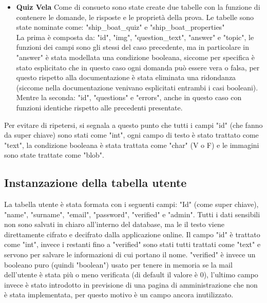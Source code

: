 \begin{itemize}
	\item \textbf{Quiz Vela}
	Come di consueto sono state create due tabelle con la funzione di contenere le domande, le risposte e le proprietà della prova. Le tabelle sono state nominate come: "ship\_boat\_quiz" e "ship\_boat\_properties"\\
	La prima è composta da: "id", "img", "question\_text", "answer" e "topic", le funzioni dei campi sono gli stessi del caso precedente, ma in particolare in "answer" è stata modellata una condizione booleana, siccome per specifica è stato esplicitato che in questo caso ogni domanda può essere vera o falsa, per questo rispetto alla documentazione è stata eliminata una ridondanza (siccome nella documentazione venivano esplicitati entrambi i casi booleani). Mentre la seconda: "id", "questions" e "errors", anche in questo caso con funzioni identiche rispetto alle precedenti presentate.  
\end{itemize}

Per evitare di ripetersi, si segnala a questo punto che tutti i campi "id" (che fanno da super chiave) sono stati come "int", ogni campo di testo è stato trattato come "text", la condizione booleana è stata trattata come "char" (V o F) e le immagini sono state trattate come "blob". 

\subsection{Instanzazione della tabella utente}
La tabella utente è stata formata con i seguenti campi: "Id" (come super chiave), "name", "surname", "email", "password", "verified" e "admin". Tutti i dati sensibili non sono salvati in chiaro all'interno del database, ma le il testo viene direttamente cifrato e decifrato dalla applicazione online. Il campo "id" è trattato come "int", invece i restanti fino a "verified" sono stati tutti trattati come "text" e servono per salvare le informazioni di cui portano il nome. "verified" è invece un booleano puro (quindi "boolean") usato per tenere in memoria se la mail dell'utente è stata più o meno verificata (di default il valore è 0), l'ultimo campo invece è stato introdotto in previsione di una pagina di amministrazione che non è stata implementata, per questo motivo è un campo ancora inutilizzato. 